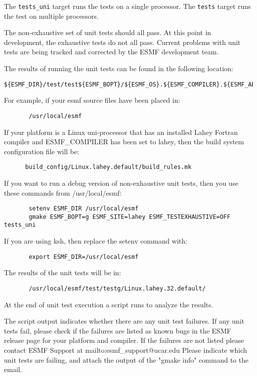 The {\tt tests\_uni} target runs the tests on a single processor. 
The {\tt tests} target runs the test on multiple processors.

The non-exhaustive set of unit tests should all pass.  At this point in 
development, the exhaustive tests do not all pass.  Current problems with 
unit tests are being tracked and corrected by the ESMF development team.

The results of running the unit tests can be found in the following location:
\begin{verbatim}
${ESMF_DIR}/test/test${ESMF_BOPT}/${ESMF_OS}.${ESMF_COMPILER}.${ESMF_ABI}.${ESMF_SITE}
\end{verbatim}

For example, if your esmf source files have been placed in: 
\begin{verbatim}
       /usr/local/esmf
\end{verbatim}

If your platform is a Linux uni-processor that has an installed Lahey
Fortran compiler and ESMF\_COMPILER has been set to lahey, then the build
system configuration file will be:

\begin{verbatim}
      build_config/Linux.lahey.default/build_rules.mk
\end{verbatim}

If you want to run a debug version of non-exhaustive unit tests,
then you use these commands from /usr/local/esmf:

\begin{verbatim}
       setenv ESMF_DIR /usr/local/esmf
       gmake ESMF_BOPT=g ESMF_SITE=lahey ESMF_TESTEXHAUSTIVE=OFF tests_uni
\end{verbatim}


If you are using ksh, then replace the setenv command with:
\begin{verbatim}
       export ESMF_DIR=/usr/local/esmf
\end{verbatim}

The results of the unit tests will be in:
\begin{verbatim}
       /usr/local/esmf/test/testg/Linux.lahey.32.default/
\end{verbatim}

At the end of unit test execution a script runs to analyze the results.

The script output indicates whether there are any unit test failures.
If any unit tests fail, please check if the failures are listed as known bugs in the ESMF release
page 
for your platform and compiler.
If the failures are not listed please contact ESMF Support at 
{mailto:esmf\_support@ucar.edu}
Please indicate which unit tests are failing, and attach the output of the "gmake info" command to the email.


